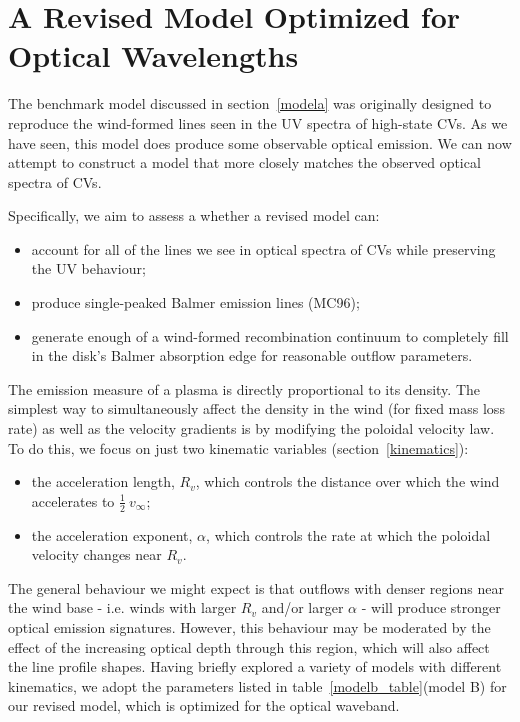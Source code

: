 \documentclass[preprint, a4paper, 11pt]{aastex}
\begin{document}
%
%

\section{A Revised Model Optimized for Optical Wavelengths}

The benchmark model discussed in section~\ref{modela} was originally
designed to reproduce the wind-formed lines seen in the UV spectra of
high-state CVs. As we have seen, this model does produce some observable
optical emission. We can now attempt to construct a model that more closely 
matches the observed optical spectra of CVs. 

Specifically, we aim to assess a whether a revised model can:

\begin{itemize}
         \item account for all of the lines we see in optical spectra of CVs while preserving
the UV behaviour;
         \item produce single-peaked Balmer emission lines (MC96); 
         \item generate enough of a wind-formed recombination continuum
to completely fill in the disk's Balmer absorption edge for 
reasonable outflow parameters.
\end{itemize} 

The emission measure of a plasma is directly proportional to its density.
The simplest way to simultaneously affect the density in the wind (for fixed mass loss rate)
as well as the velocity gradients is by modifying the poloidal velocity
law. To do this, we focus on just two kinematic variables (section~\ref{kinematics}):

\begin{itemize}
         \item the acceleration length, $R_v$, which controls the
        distance over which the wind accelerates to $\frac{1}{2}~v_{\infty}$;
         \item the acceleration exponent, $\alpha$, which controls the rate 
         at which the poloidal velocity changes near $R_v$.
\end{itemize} 

The general behaviour we might expect is that outflows with denser
regions near the wind base - i.e. winds with larger $R_{v}$ and/or
larger $\alpha$ - will produce stronger optical emission signatures. 
However, this behaviour may be moderated by the effect of the increasing
optical depth through this region, which will also affect the line profile shapes. 
Having briefly explored a variety of models with different kinematics,
we adopt the parameters listed in table~\ref{modelb_table}(model B) for our revised model,
which is optimized for the optical waveband.
\end{document}
